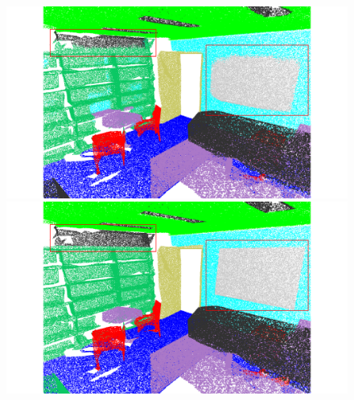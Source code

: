 \begin{figure}[htbp]
\begin{minipage}{0.185\textwidth}
    \end{minipage}
    \hfill
    \begin{minipage}{0.185\textwidth}
        \centering
        \includegraphics[width=\textwidth]{fig/supplement/semantic_segmentation/office_35/PLT_office_35.pdf}
    \end{minipage}
    \hfill
    \begin{minipage}{0.185\textwidth}
        \centering
        \includegraphics[width=\textwidth]{fig/supplement/semantic_segmentation/office_35/GT_office_35.pdf}
    \end{minipage}
    \hfill
    

\end{figure}
